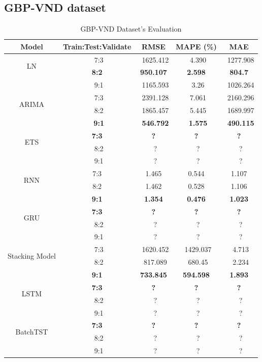 \documentclass{ieeeojies}
\begin{document}
\subsection{GBP-VND dataset} 
\begin{table}[H]
    \centering
    \begin{tabular}{|c|c|c|c|c|}
         \hline
         \centering Model & Train:Test:Validate & RMSE & MAPE (\%) & MAE\\
         \hline
         \multirow{2}{*}{LN} &\ 7:3  &\ 1625.412 &\ 4.390 &\ 1277.908  \\ &\textbf{8:2} &\textbf{950.107} &\textbf{2.598} &\textbf{804.7} \\&\ 9:1 &\ 1165.593 &\ 3.26 &\ 1026.264 \\
         \hline
         \multirow{2}{*}{ARIMA} &\ 7:3 &\ 2391.128&\ 7.061 &\ 2160.296 \\ &\ 8:2 &\ 1865.457 &\ 5.445 &\ 1689.997 \\&\ \textbf{9:1} &\ \textbf{546.792} &\ \textbf{1.575} &\ \textbf{490.115} \\
         \hline
         \multirow{2}{*}{ETS} &\textbf{7:3} &\textbf{?}&\textbf{?}&\textbf{?} \\ &\ 8:2 &\ ?&\ ? &\ ? \\&\ 9:1 &\ ? &\ ? &\ ? \\
         \hline
         \multirow{2}{*}{RNN} & 7:3 & 1.465 & 0.544 & 1.107  \\ & 8:2 & 1.462 & 0.528 & 1.106 \\&\textbf{ 9:1} & \textbf{1.354} &\textbf{ 0.476} &\textbf{ 1.023} \\
         \hline
         \multirow{2}{*}{GRU} &\textbf{7:3} &\textbf{?}&\textbf{?}&\textbf{?} \\ &\ 8:2 &\ ?&\ ? &\ ? \\&\ 9:1 &\ ? &\ ? &\ ? \\
         \hline
         \multirow{2}{*}{Stacking Model} &\ 7:3 &\ 1620.452&\ 1429.037&\ 4.713 \\ &\ 8:2 &\ 817.089&\ 680.45 &\ 2.234 \\&\textbf{9:1} &\textbf{733.845} &\textbf{594.598} &\textbf{1.893} \\
         \hline
         \multirow{2}{*}{LSTM} &\textbf{7:3} &\textbf{?}&\textbf{?}&\textbf{?} \\ &\ 8:2 &\ ?&\ ? &\ ? \\&\ 9:1 &\ ? &\ ? &\ ? \\
         \hline
         \multirow{2}{*}{BatchTST} &\textbf{7:3} &\textbf{?}&\textbf{?}&\textbf{?} \\ &\ 8:2 &\ ?&\ ? &\ ? \\&\ 9:1 &\ ? &\ ? &\ ? \\
         \hline
    \end{tabular}
    \caption{GBP-VND Dataset's Evaluation}
    \label{mbbresult}
\end{table}
\end{document}
